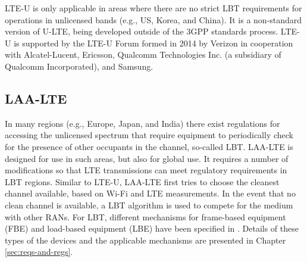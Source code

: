 \mbox{LTE-U} is only applicable in areas where there are no strict LBT requirements for operations in unlicensed bands (e.g., US, Korea, and China). It is a non-standard version of \mbox{U-LTE}, being developed outside of the 3GPP standards process. \mbox{LTE-U} is supported by the \mbox{LTE-U} Forum formed in 2014 by Verizon in cooperation with Alcatel-Lucent, Ericsson, Qualcomm Technologies Inc. (a subsidiary of Qualcomm Incorporated), and Samsung.

\subsection{LAA-LTE}\label{laa-lte}
In many regions (e.g., Europe, Japan, and India) there exist regulations for accessing the unlicensed spectrum that require equipment to periodically check for the presence of other occupants in the channel, so-called LBT. \mbox{LAA-LTE} is designed for use in such areas, but also for global use. It requires a number of modifications so that LTE transmissions can meet regulatory requirements in LBT regions. Similar to \mbox{LTE-U}, \mbox{LAA-LTE} first tries to choose the cleanest channel available, based on \mbox{Wi-Fi} and LTE measurements. In the event that no clean channel is available, a LBT algorithm is used to compete for the medium with other RANs. For LBT, different mechanisms for frame-based equipment (FBE) and load-based equipment (LBE) have been specified in \cite{LBT-ETSI-2014}. Details of these types of the devices and the applicable mechanisms are presented in Chapter \ref{sec:reqs-and-regs}.

